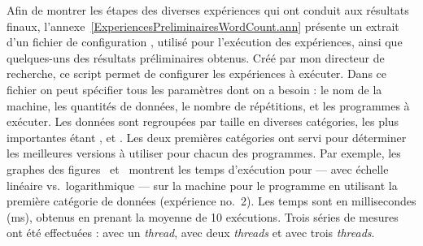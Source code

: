 



Afin de montrer les \'etapes des diverses exp\'eriences qui ont conduit aux r\'esultats finaux, l'annexe~\ref{ExperiencesPreliminairesWordCount.ann} pr\'esente un extrait d'un fichier de configuration , utilis\'e pour l'ex\'ecution des expériences, ainsi que quelques-uns des r\'esultats préliminaires obtenus. Cr\'e\'e par mon directeur de recherche, ce script permet de configurer les expériences \`a ex\'ecuter. Dans ce fichier on peut sp\'ecifier tous les param\`etres dont on a besoin : le nom de la machine, les quantités de donn\'ees, le nombre de r\'ep\'etitions, et les programmes \`a ex\'ecuter. Les donn\'ees sont regroup\'ees par taille en diverses cat\'egories, les plus importantes étant ,  et . Les deux premi\`eres cat\'egories ont servi pour d\'eterminer les meilleures versions \`a utiliser pour chacun des programmes. Par exemple, les graphes des figures~ et~ montrent les temps d'ex\'ecution pour  --- avec échelle linéaire vs.\ logarithmique --- sur la machine  pour le programme  en utilisant la premi\`ere cat\'egorie de donn\'ees (expérience no.~2). Les temps sont en millisecondes (ms), obtenus en prenant la moyenne de 10 ex\'ecutions.  Trois  s\'eries de mesures ont \'et\'e effectu\'ees :  avec un \emph{thread},  avec deux \emph{threads} et  avec trois \emph{threads}. 



